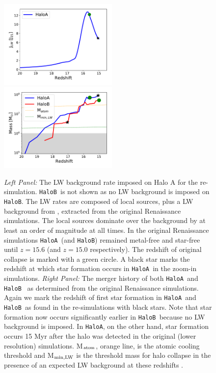 \documentclass[graphics, twocolumn, usenatbib]{mn2e}
\newcommand{\ha} {\texttt{HaloA~}}
\newcommand{\hb} {\texttt{HaloB~}}
\newcommand{\hac} {\texttt{HaloA}}
\newcommand{\hbc} {\texttt{HaloB}}
\begin{document}
\begin{figure}
\centering
\begin{minipage}{175mm}      \begin{center} 
\centerline{
\includegraphics[width=0.52\textwidth]{FIGURES/Combined.pdf}
\includegraphics[width=0.52\textwidth]{FIGURES/MassRedshift.pdf}}
\caption{\textit{Left Panel:} The LW background rate imposed on Halo A for the re-simulation. \hb is not shown
  as no LW background is imposed on \hbc. The LW rates
  are composed of local sources, plus a LW background from \citet{Wise_2012b}, extracted from the original
  Renaissance simulations. The local sources dominate over the background by at least an order of magnitude at
  all times. In the original
  Renaissance simulations \ha (and \texttt{HaloB})  remained metal-free and star-free until $z = 15.6$ (and
  $z = 15.0$ respectively). The redshift of original collapse is marked with a green circle.
  A black star marks the redshift at which star formation occurs in \ha in the zoom-in simulations.
  \textit{Right Panel:} The merger history of both \ha and \hb
  as determined from the original Renaissance simulations. Again we mark the redshift of first star formation
  in \ha and \hb as found in the re-simulations with black stars. Note that star formation now occurs significantly
  earlier in \hb because no LW background is imposed. In \hac, on the other hand, star formation occurs 15 Myr after
  the halo was detected in the original (lower resolution) simulations. M$_{\rm atom}$, orange line, is the atomic cooling threshold \citep{Fernandez_2014} and M$_{\rm min,LW}$ is the threshold mass for halo collapse in the presence of an expected LW background at these redshifts \citep{Machacek_2001, OShea_2008}.
  }  \label{Fig:LWHistory}
\end{center} \end{minipage}

\end{figure}
\end{document}
